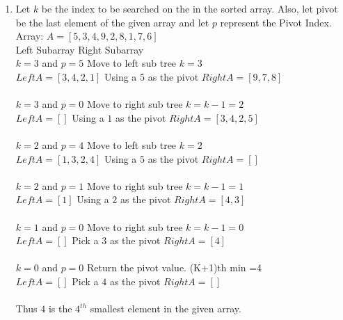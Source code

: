 \documentclass[9pt]{article}
\begin{document}
\begin{enumerate}
    \item
    Let $k$ be the index to be searched on the in the sorted array. Also, let pivot be the last element of the given array and let $p$ represent the Pivot Index.\\
    Array: $A=[5, 3, 4, 9, 2, 8, 1, 7, 6]$\\
    Left Subarray \phantom{..................} \phantom{..................} \phantom{..................} \phantom{..................} Right Subarray\\
    
    
    $k=3$ and $p=5$ Move to left sub tree $k=3$\\
    $Left A = [3,4,2,1]$ \phantom{..................} Using a $5$ as the pivot \phantom{..................} $Right A = [9,7,8]$ \\\\
    
    $k=3$ and $p=0$ Move to right sub tree $k=k-1=2$\\
    $Left A = []$ \phantom{..............................} Using a $1$ as the pivot \phantom{..................} $Right A = [3,4,2,5]$\\\\
    
    $k=2$ and $p=4$ Move to left sub tree $k=2$\\
    $Left A = [1,3,2,4]$ \phantom{..................} Using a $5$ as the pivot \phantom{..................} $Right A = []$\\\\
    
    $k=2$ and $p=1$ Move to right sub tree $k=k-1=1$\\
    $Left A = [1]$ \phantom{.............................} Using a $2$ as the pivot \phantom{..................} $Right A = [4,3]$\\\\
    
     $k=1$ and $p=0$ Move to right sub tree $k=k-1=0$\\
    $Left A = []$ \phantom{..............................} Pick a $3$ as the pivot \phantom{..................} $Right A = [4]$\\\\
    
     $k=0$ and $p=0$ Return the pivot value. (K+1)th min =4\\
    $Left A = []$ \phantom{..............................} Pick a $4$ as the pivot \phantom{..................} $Right A = []$\\\\
    Thus $4$ is the $4^{th}$ smallest element in the given array.\\
    

\end{enumerate}
\end{document}
